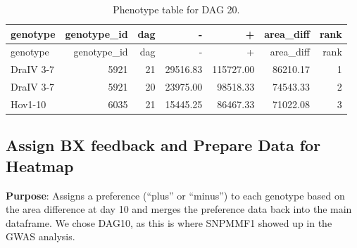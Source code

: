 \documentclass[
  11pt,
]{article}
\begin{document}
\begin{longtable}[]{@{}lrrrrrr@{}}
\caption{Phenotype table for DAG 20.}\tabularnewline
\toprule\noalign{}
genotype & genotype\_id & dag & - & + & area\_diff & rank \\
\midrule\noalign{}
\endfirsthead
\toprule\noalign{}
genotype & genotype\_id & dag & - & + & area\_diff & rank \\
\midrule\noalign{}
\endhead
\bottomrule\noalign{}
\endlastfoot
DraIV 3-7 & 5921 & 21 & 29516.83 & 115727.00 & 86210.17 & 1 \\
DraIV 3-7 & 5921 & 20 & 23975.00 & 98518.33 & 74543.33 & 2 \\
Hov1-10 & 6035 & 21 & 15445.25 & 86467.33 & 71022.08 & 3 \\
\end{longtable}

\subsection{Assign BX feedback and Prepare Data for
Heatmap}\label{assign-bx-feedback-and-prepare-data-for-heatmap}

\textbf{Purpose}: Assigns a preference (``plus'' or ``minus'') to each
genotype based on the area difference at day 10 and merges the
preference data back into the main dataframe. We chose DAG10, as this is
where SNPMMF1 showed up in the GWAS analysis.
\end{document}
